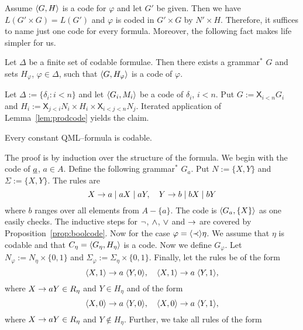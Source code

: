 Assume $\langle G, H\rangle$ is a code for $\varphi$ and let
$G'$ be given. Then we have $L(G' \times G) = L(G')$ and
$\varphi$ is coded in $G' \times G$ by $N' \times H$.
Therefore, it suffices to name just one code for every
formula. Moreover, the following fact makes life simpler 
for us.
\begin{lem}
Let $\Delta$ be a finite set of codable formulae.
Then there exists a grammar$^{\ast}$ $G$ and sets $H_{\varphi}$,
$\varphi \in \Delta$, such that $\langle G, H_{\varphi}\rangle$
is a code of $\varphi$.
\end{lem}
\proofbeg
\newcommand{\bigtimes}{\mathsf{X}}%
Let $\Delta := \{\delta_i : i < n\}$
and let $\langle G_i, M_i\rangle$ be a code of $\delta_i$,
$i < n$. Put $G := \bigtimes_{i < n} G_i$
and $H_i := \bigtimes_{j < i} N_i \times
H_i \times \bigtimes_{i < j < n} N_j$.
Iterated application of Lemma~\ref{lem:prodcode}
yields the claim.
\proofend
\begin{thm}
\label{thm:code}
Every constant QML--formula is codable.
\end{thm}
\proofbeg
The proof is by induction over the structure of the formula.
We begin with the code of $\underline{a}$, $a \in A$. Define
the following grammar$^{\ast}$ $G_{a}$. Put $N := \{X, Y\}$ and
$\Sigma := \{X, Y\}$. The rules are
\begin{equation}
X \rightarrow a \mid aX \mid aY, \quad Y \rightarrow b \mid bX \mid bY 
\end{equation}
where $b$ ranges over all elements from $A - \{a\}$. The
code is $\langle G_a, \{X\}\rangle$ as one easily checks.
The inductive steps for $\neg$, $\wedge$, $\vee$
and $\rightarrow$ are covered by Proposition~\ref{prop:boolcode}.
Now for the case $\varphi = \langle \prec\rangle \eta$. We assume that
$\eta$ is codable and that $C_{\eta} = \langle G_{\eta}, H_{\eta}\rangle$
is a code. Now we define $G_{\varphi}$. Let
$N_{\varphi} := N_{\eta}\times \{0,1\}$ and $\Sigma_{\varphi} :=
\Sigma_{\eta} \times \{0,1\}$. Finally, let the rules be of the 
form
\begin{equation}
\langle X,1\rangle \rightarrow a\; \langle Y,0\rangle, \quad
\langle X,1\rangle \rightarrow a\; \langle Y,1\rangle,
\end{equation}
where $X \rightarrow aY \in R_{\eta}$ and $Y \in H_{\eta}$ and
of the form
\begin{equation}
\langle X,0\rangle \rightarrow a\; \langle Y,0\rangle, \quad
\langle X,0\rangle \rightarrow a\; \langle Y,1\rangle,
\end{equation}
where $X \rightarrow aY \in R_{\eta}$ and $Y \not\in H_{\eta}$. Further,
we take all rules of the form
